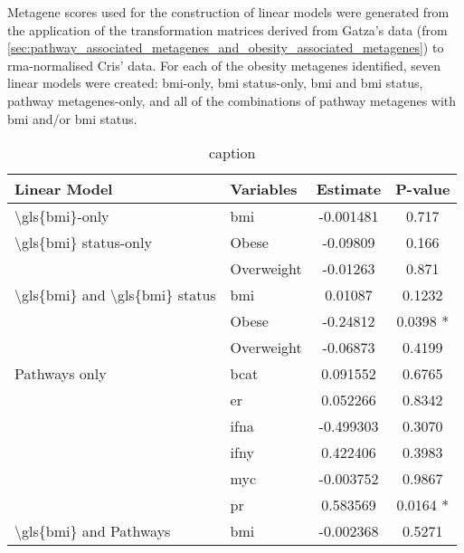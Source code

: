 Metagene scores used for the construction of linear models were generated from the application of the transformation matrices derived from Gatza's data (from \cref{sec:pathway_associated_metagenes_and_obesity_associated_metagenes}) to \gls{rma}-normalised Cris' data.
For each of the obesity metagenes identified, seven linear models were created: \gls{bmi}-only, \gls{bmi} status-only, \gls{bmi} and \gls{bmi} status, pathway metagenes-only, and all of the combinations of pathway metagenes with \gls{bmi} and/or \gls{bmi} status.

\begin{table}[htpb]
	\centering
	\caption{caption}
	\label{tab:lm_sig_var}
	\begin{tabular}{llcc}
		Linear Model & Variables & Estimate & P-value\\
		\hline
		\gls{\gls{bmi}}-only                                 & \gls{bmi}  & -0.001481 & 0.717      \\
		\gls{\gls{bmi}} status-only                          & Obese      & -0.09809  & 0.166      \\
                                                             & Overweight & -0.01263  & 0.871      \\
		\gls{\gls{bmi}} and \gls{\gls{bmi}} status           & \gls{bmi}  & 0.01087   & 0.1232     \\
                                                             & Obese      & -0.24812  & 0.0398 *   \\
                                                             & Overweight & -0.06873  & 0.4199     \\
		Pathways only                                        & \gls{bcat} & 0.091552  & 0.6765     \\
                                                             & \gls{er}   & 0.052266  & 0.8342     \\
                                                             & \gls{ifna} & -0.499303 & 0.3070     \\
                                                             & \gls{ifny} & 0.422406  & 0.3983     \\
                                                             & myc        & -0.003752 & 0.9867     \\
                                                             & \gls{pr}   & 0.583569  & 0.0164   * \\
		\gls{\gls{bmi}} and Pathways                         & \gls{bmi}  & -0.002368 & 0.5271     \\

\end{tabular}
\end{table}
